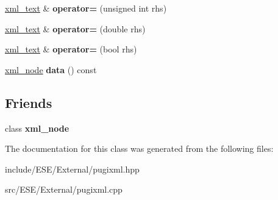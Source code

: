 \begin{DoxyCompactItemize}
\item 
\hypertarget{classpugi_1_1xml__text_a48e2aa3796629258d1f037d1bc2277f7}{\hyperlink{classpugi_1_1xml__text}{xml\-\_\-text} \& {\bfseries operator=} (unsigned int rhs)}\label{classpugi_1_1xml__text_a48e2aa3796629258d1f037d1bc2277f7}

\item 
\hypertarget{classpugi_1_1xml__text_a0ff3e37177494d9cdfa073c6392ca405}{\hyperlink{classpugi_1_1xml__text}{xml\-\_\-text} \& {\bfseries operator=} (double rhs)}\label{classpugi_1_1xml__text_a0ff3e37177494d9cdfa073c6392ca405}

\item 
\hypertarget{classpugi_1_1xml__text_afd64e76239853fcf57e80b8f43a3fb4d}{\hyperlink{classpugi_1_1xml__text}{xml\-\_\-text} \& {\bfseries operator=} (bool rhs)}\label{classpugi_1_1xml__text_afd64e76239853fcf57e80b8f43a3fb4d}

\item 
\hypertarget{classpugi_1_1xml__text_a30ca257f1614159c625d2904a6285224}{\hyperlink{classpugi_1_1xml__node}{xml\-\_\-node} {\bfseries data} () const }\label{classpugi_1_1xml__text_a30ca257f1614159c625d2904a6285224}

\end{DoxyCompactItemize}
\subsection*{Friends}
\begin{DoxyCompactItemize}
\item 
\hypertarget{classpugi_1_1xml__text_a156d917a92815c7b593bd5ef19f6d5fb}{class {\bfseries xml\-\_\-node}}\label{classpugi_1_1xml__text_a156d917a92815c7b593bd5ef19f6d5fb}

\end{DoxyCompactItemize}


The documentation for this class was generated from the following files\-:\begin{DoxyCompactItemize}
\item 
include/\-E\-S\-E/\-External/pugixml.\-hpp\item 
src/\-E\-S\-E/\-External/pugixml.\-cpp\end{DoxyCompactItemize}
